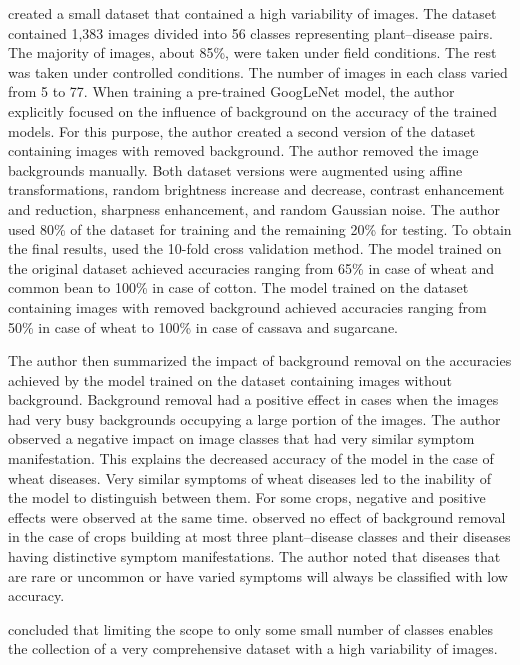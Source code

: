 \documentclass{BachelorBUI}
\begin{document}
        \textcite{Barbedo:2018:1} created a small dataset that contained a high variability of images. The dataset contained 1,383 images divided into 56 classes representing plant--disease pairs. The majority of images, about 85\%, were taken under field conditions. The rest was taken under controlled conditions. The number of images in each class varied from 5 to 77. When training a pre-trained GoogLeNet model, the author explicitly focused on the influence of background on the accuracy of the trained models. For this purpose, the author created a second version of the dataset containing images with removed background. The author removed the image backgrounds manually. Both dataset versions were augmented using affine transformations, random brightness increase and decrease, contrast enhancement and reduction, sharpness enhancement, and random Gaussian noise. The author used 80\% of the dataset for training and the remaining 20\% for testing. To obtain the final results, \textcite{Barbedo:2018:1} used the 10-fold cross validation method. The model trained on the original dataset achieved accuracies ranging from 65\% in case of wheat and common bean to 100\% in case of cotton. The model trained on the dataset containing images with removed background achieved accuracies ranging from 50\% in case of wheat to 100\% in case of cassava and sugarcane.

        The author then summarized the impact of background removal on the accuracies achieved by the model trained on the dataset containing images without background. Background removal had a positive effect in cases when the images had very busy backgrounds occupying a large portion of the images. The author observed a negative impact on image classes that had very similar symptom manifestation. This explains the decreased accuracy of the model in the case of wheat diseases. Very similar symptoms of wheat diseases led to the inability of the model to distinguish between them. For some crops, negative and positive effects were observed at the same time. \textcite{Barbedo:2018:1} observed no effect of background removal in the case of crops building at most three plant--disease classes and their diseases having distinctive symptom manifestations. The author noted that diseases that are rare or uncommon or have varied symptoms will always be classified with low accuracy.

        \textcite{Barbedo:2018:1} concluded that limiting the scope to only some small number of classes enables the collection of a very comprehensive dataset with a high variability of images.
\end{document}
